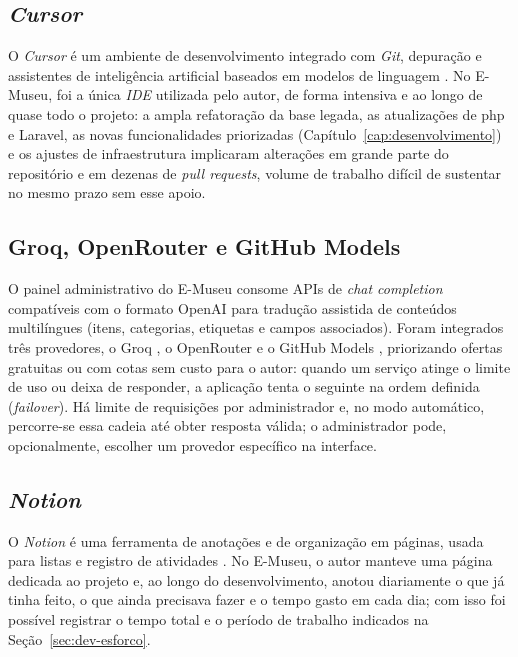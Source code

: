 \subsection{\textit{Cursor}}

O \textit{Cursor} é um ambiente de desenvolvimento integrado com \textit{Git}, depuração e assistentes de inteligência artificial baseados em modelos de linguagem \cite{cursor}. No E-Museu, foi a única \textit{IDE} utilizada pelo autor, de forma intensiva e ao longo de quase todo o projeto: a ampla refatoração da base legada, as atualizações de \acrshort{php} e Laravel, as novas funcionalidades priorizadas (Capítulo~\ref{cap:desenvolvimento}) e os ajustes de infraestrutura implicaram alterações em grande parte do repositório e em dezenas de \textit{pull requests}, volume de trabalho difícil de sustentar no mesmo prazo sem esse apoio.


\subsection{Groq, OpenRouter e GitHub Models}\label{sec:materiais-ia-provedores}

O painel administrativo do E-Museu consome APIs de \textit{chat completion} compatíveis com o formato OpenAI para tradução assistida de conteúdos multilíngues (itens, categorias, etiquetas e campos associados). Foram integrados três provedores, o Groq \cite{groq}, o OpenRouter \cite{openrouter} e o GitHub Models \cite{githubmodels}, priorizando ofertas gratuitas ou com cotas sem custo para o autor: quando um serviço atinge o limite de uso ou deixa de responder, a aplicação tenta o seguinte na ordem definida (\textit{failover}). Há limite de requisições por administrador e, no modo automático, percorre-se essa cadeia até obter resposta válida; o administrador pode, opcionalmente, escolher um provedor específico na interface.


\subsection{\textit{Notion}}\label{sec:materiais-notion}

O \textit{Notion} é uma ferramenta de anotações e de organização em páginas, usada para listas e registro de atividades \cite{notion}. No E-Museu, o autor manteve uma página dedicada ao projeto e, ao longo do desenvolvimento, anotou diariamente o que já tinha feito, o que ainda precisava fazer e o tempo gasto em cada dia; com isso foi possível registrar o tempo total e o período de trabalho indicados na Seção~\ref{sec:dev-esforco}.


